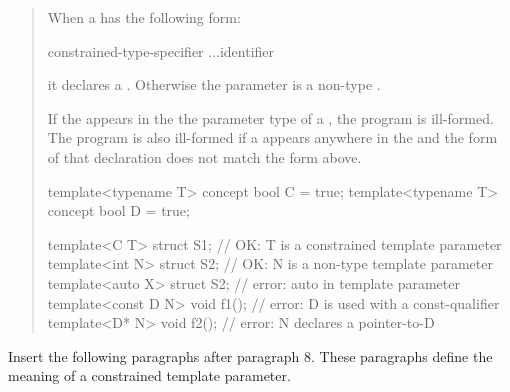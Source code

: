 \begin{quote}
\pnum
When a  has
the following form:
\begin{bnf}
constrained-type-specifier ...\opt identifier\opt
\end{bnf}
it declares a .
% 
Otherwise the parameter is a non-type .

\pnum
If the  
appears in the the parameter type of a
,
the program is ill-formed. The program is also ill-formed if a
 appears
anywhere in the  
and the form of that declaration does not match the form above.
% 
\enterexample
\begin{codeblock}
template<typename T> concept bool C = true;
template<typename T> concept bool D = true;

template<C T> struct S1;       // OK: T is a constrained template parameter
template<int N> struct S2;     // OK: N is a non-type template parameter
template<auto X> struct S2;    // error: auto in template parameter
template<const D N> void f1(); // error: D is used with a const-qualifier
template<D* N> void f2();      // error: N declares a pointer-to-D
\end{codeblock}
\exitexample
\end{quote}

Insert the following paragraphs after paragraph 8. These paragraphs
define the meaning of a constrained template parameter.

